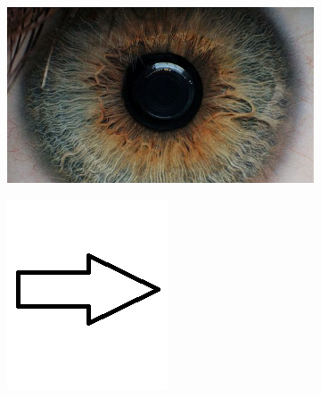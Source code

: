 \documentclass{article}
\begin{document}
\begin{figure}[H]
\centering
\begin{subfigure}{.47\textwidth}
  \centering
  \includegraphics[width=0.97\linewidth]{_Figures/raw_data_1.jpg}
  \caption{}
  \label{fig:raw_1}
\end{subfigure}%
\begin{subfigure}{.09\textwidth}
  \centering
  \includegraphics[width=0.97\linewidth]{_Figures/leftrightarrow.jpg}
  \label{fig:arrow}
\end{subfigure}%

\end{figure}
\end{document}
